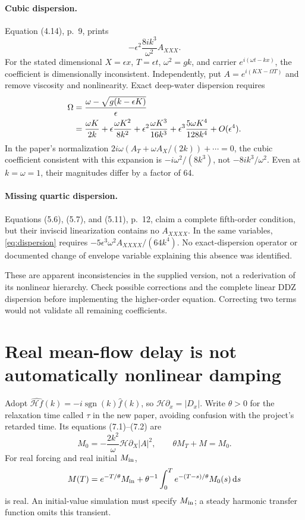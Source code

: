 \documentclass[11pt]{article}
\newcommand{\HH}{\mathcal H}
\newcommand{\dd}{\,\mathrm d}
\begin{document}
\paragraph{Cubic dispersion.}
Equation (4.14), p.~9, prints
\[
 -\epsilon^2\frac{8ik^3}{\omega^2}A_{XXX}.
\]
For the stated dimensional \(X=\epsilon x\), \(T=\epsilon t\),
\(\omega^2=gk\), and carrier \(e^{i(\omega t-kx)}\), the coefficient
is dimensionally inconsistent. Independently, put
\(A=e^{i(KX-\Omega T)}\) and remove viscosity and nonlinearity.
Exact deep-water dispersion requires
\begin{align}
 \Omega
 &=\frac{\omega-\sqrt{g(k-\epsilon K)}}{\epsilon} \notag\\
 &=\frac{\omega K}{2k}
 +\epsilon\frac{\omega K^2}{8k^2}
 +\epsilon^2\frac{\omega K^3}{16k^3}
 +\epsilon^3\frac{5\omega K^4}{128k^4}
 +O(\epsilon^4).
 \label{eq:dispersion}
\end{align}
In the paper's normalization
\(2i\omega(A_T+\omega A_X/(2k))+\cdots=0\),
the cubic coefficient consistent with this expansion is
\(-i\omega^2/(8k^3)\), not \(-8ik^3/\omega^2\).
Even at \(k=\omega=1\), their magnitudes differ by a factor of 64.

\paragraph{Missing quartic dispersion.}
Equations (5.6), (5.7), and (5.11), p.~12, claim a complete fifth-order
condition, but their inviscid linearization contains no \(A_{XXXX}\).
In the same variables, \eqref{eq:dispersion} requires
\(-5\epsilon^3\omega^2 A_{XXXX}/(64k^4)\).
No exact-dispersion operator or documented change of envelope variable
explaining this absence was identified.

These are apparent inconsistencies in the supplied version, not a
rederivation of its nonlinear hierarchy. Check possible corrections
and the complete linear DDZ dispersion before implementing the
higher-order equation. Correcting two terms would not validate
all remaining coefficients.

\section{Real mean-flow delay is not automatically nonlinear damping}
Adopt \(\widehat{\HH f}(k)=-i\operatorname{sgn}(k)\widehat f(k)\),
so \(\HH\partial_x=|D_x|\).
Write \(\theta>0\) for the relaxation time called \(\tau\) in the
new paper, avoiding confusion with the project's retarded time.
Its equations (7.1)--(7.2) are
\begin{equation}
 M_0=-\frac{2k^2}{\omega}\HH\partial_X|A|^2,\qquad
 \theta M_T+M=M_0.
 \label{eq:relax}
\end{equation}
For real forcing and real initial \(M_{\rm in}\),
\begin{equation}
 M(T)=e^{-T/\theta}M_{\rm in}
 +\theta^{-1}\int_0^T e^{-(T-s)/\theta}M_0(s)\dd s
 \label{eq:convolution}
\end{equation}
is real. An initial-value simulation must specify \(M_{\rm in}\);
a steady harmonic transfer function omits this transient.
\end{document}

